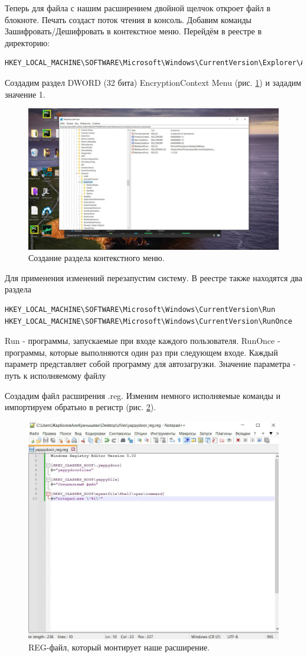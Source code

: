 Теперь для файла с нашим расширением двойной щелчок откроет файл в блокноте. Печать создаст поток чтения в консоль. Добавим команды Зашифровать/Дешифровать в контекстное меню. Перейдём в реестре в директорию:
\begin{verbatim}
HKEY_LOCAL_MACHINE\SOFTWARE\Microsoft\Windows\CurrentVersion\Explorer\Advanced
\end{verbatim}

Создадим раздел DWORD (32 бита) EncryptionContext Menu (рис. \ref{fig:contextmenu}) и зададим значение 1.

\begin{figure}[h!]
    \centering
    \includegraphics[width=0.5\linewidth]{Pic/lab2/photo_2025-05-22_00-26-20.jpg}
    \caption{Создание раздела контекстного меню.}
    \label{fig:contextmenu}
\end{figure}
\newpage
Для применения изменений перезапустим систему. В реестре также находятся два раздела
\begin{verbatim}
HKEY_LOCAL_MACHINE\SOFTWARE\Microsoft\Windows\CurrentVersion\Run
HKEY_LOCAL_MACHINE\SOFTWARE\Microsoft\Windows\CurrentVersion\RunOnce
\end{verbatim}

Run - программы, запускаемые при входе каждого пользователя. RunOnce - программы, которые выполняются один раз при следующем входе. Каждый параметр представляет собой программу для автозагрузки. Значение параметра - путь к исполняемому файлу

Создадим файл расширения .reg. Изменим немного исполняемые команды и импортируем обратьно в регистр (рис. \ref{fig:REG}). 

\begin{figure}[h!]
    \centering
    \includegraphics[width=0.3\linewidth]{Pic/lab2/photo_2025-05-22_00-26-22.jpg}
    \caption{REG-файл, который монтирует наше расширение.}
    \label{fig:REG}
\end{figure}

